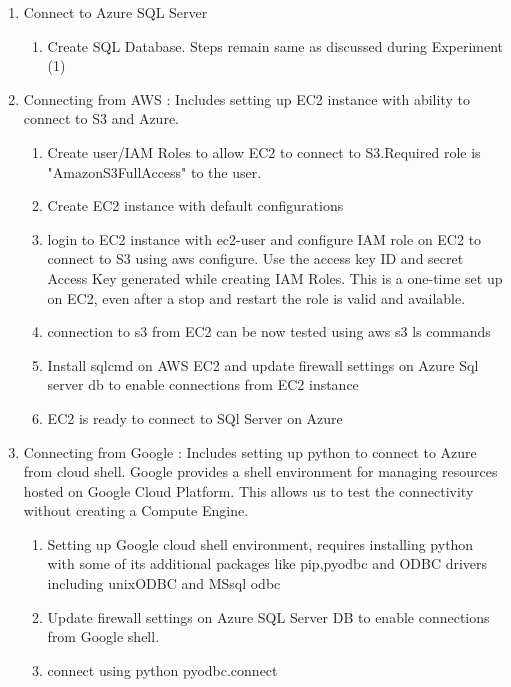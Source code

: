 \documentclass[journal]{hybrid-cloud}
\begin{document}
\begin{enumerate}
	\begin{enumerate} 
 		\item Connect to Azure SQL Server 
 		\begin{enumerate}
 			\item Create SQL Database. Steps remain same as discussed during Experiment (1)
 				
 		\end{enumerate}
 		
 		\item Connecting from AWS : Includes setting up EC2 instance with ability to connect to S3 and Azure.
 		\begin{enumerate}
 			\item Create user/IAM Roles to allow EC2 to connect to S3.Required role is "AmazonS3FullAccess" to the user.
 			\item Create EC2 instance with default configurations
 			\item login to EC2 instance with ec2-user and configure IAM role on EC2 to connect to S3 using aws configure. Use the access key ID and secret Access Key generated while creating IAM Roles. This is a one-time set up on EC2, even after a stop and restart the role is valid and available.
 			\item connection to s3 from EC2 can be now tested using aws s3 ls commands
 			\item Install sqlcmd on AWS EC2 and update firewall settings on Azure Sql server db to enable connections from EC2 instance
 			\item EC2 is ready to connect to SQl Server on Azure
 			
 		\end{enumerate}
 		\item Connecting from Google : Includes setting up python to connect to Azure from cloud shell. Google provides a shell environment for managing resources hosted on Google Cloud Platform. This allows us to test the connectivity without creating a Compute Engine.
 		\begin{enumerate}
 			\item Setting up Google cloud shell environment, requires installing python with some of its additional packages like pip,pyodbc and ODBC drivers including unixODBC and MSsql odbc 
 			\item Update firewall settings on Azure SQL Server DB to enable connections from Google shell.
 			\item connect using python pyodbc.connect  
 		\end{enumerate}
	 \end{enumerate}

 
\end{enumerate}
\end{document}
